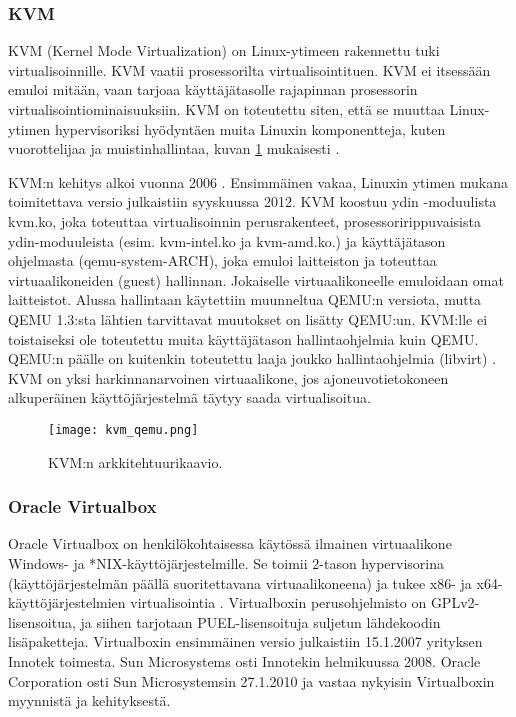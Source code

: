\subsubsection{KVM}
KVM (Kernel Mode Virtualization) on Linux-ytimeen rakennettu tuki virtualisoinnille. KVM vaatii prosessorilta virtualisointituen. KVM ei itsessään emuloi mitään, vaan tarjoaa käyttäjätasolle rajapinnan prosessorin virtualisointiominaisuuksiin. KVM on toteutettu siten, että se muuttaa Linux-ytimen hypervisoriksi hyödyntäen muita Linuxin komponentteja, kuten vuorottelijaa ja muistinhallintaa, kuvan \ref{kuva_kvm} mukaisesti \cite{kvm1}.

KVM:n kehitys alkoi vuonna 2006 \cite{kvm3}. Ensimmäinen vakaa, Linuxin ytimen mukana toimitettava versio julkaistiin syyskuussa 2012. KVM koostuu ydin -moduulista kvm.ko, joka toteuttaa virtualisoinnin perusrakenteet, prosessoririppuvaisista ydin-moduuleista (esim. kvm-intel.ko ja kvm-amd.ko.) ja käyttäjätason ohjelmasta (qemu-system-ARCH), joka emuloi laitteiston ja toteuttaa virtuaalikoneiden (guest) hallinnan. Jokaiselle virtuaalikoneelle emuloidaan omat laitteistot. Alussa hallintaan käytettiin muunneltua QEMU:n versiota, mutta QEMU 1.3:sta lähtien tarvittavat muutokset on lisätty QEMU:un. KVM:lle ei toistaiseksi ole toteutettu muita käyttäjätason hallintaohjelmia kuin QEMU. QEMU:n päälle on kuitenkin toteutettu laaja joukko hallintaohjelmia (libvirt) \cite{kvm2}. KVM on yksi harkinnanarvoinen virtuaalikone, jos ajoneuvotietokoneen alkuperäinen käyttöjärjestelmä täytyy saada virtualisoitua.


\begin{figure}[H]
\centering
\texttt{[image: kvm\_qemu.png]}
\caption{KVM:n arkkitehtuurikaavio.\cite{kvm4}}
\label{kuva_kvm}
\end{figure}

\subsubsection{Oracle Virtualbox}

Oracle Virtualbox on henkilökohtaisessa käytössä ilmainen virtuaalikone Windows- ja *NIX-käyttöjärjestelmille. Se toimii 2-tason hypervisorina (käyttöjärjestelmän päällä suoritettavana virtuaalikoneena) ja tukee x86- ja x64-käyttöjärjestelmien virtualisointia \cite{virtualbox_manual}. Virtualboxin perusohjelmisto on GPLv2-lisensoitua, ja siihen tarjotaan  PUEL-lisensoituja suljetun lähdekoodin lisäpaketteja. Virtualboxin ensimmäinen versio julkaistiin 15.1.2007 yrityksen Innotek toimesta. Sun Microsystems osti Innotekin helmikuussa 2008. Oracle Corporation osti Sun Microsystemsin 27.1.2010 ja vastaa nykyisin Virtualboxin myynnistä ja kehityksestä.


